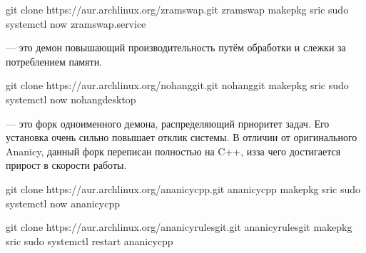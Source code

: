 \documentclass[letterpaper,10pt,russian,openany]{sphinxmanual}
\begin{document}
\begin{sphinxVerbatim}[commandchars=\\\{\}]
git clone https://aur.archlinux.org/zramswap.git  
 zramswap                                       
makepkg \PYGZhy{}sric                                     
sudo systemctl  \PYGZhy{}\PYGZhy{}now zramswap.service      
\end{sphinxVerbatim}

\sphinxAtStartPar
{}   — это демон повышающий производительность путём обработки и слежки за потреблением памяти.

\begin{sphinxVerbatim}[commandchars=\\\{\}]
git clone https://aur.archlinux.org/nohang\PYGZhy{}git.git 
 nohang\PYGZhy{}git                                      
makepkg \PYGZhy{}sric                                      
sudo systemctl  \PYGZhy{}\PYGZhy{}now nohang\PYGZhy{}desktop         
\end{sphinxVerbatim}

\sphinxAtStartPar
{}  — это форк одноименного демона, распределяющий приоритет задач. Его установка очень сильно повышает отклик системы. В отличии от оригинального Ananicy, данный форк переписан полностью на C++, из\sphinxhyphen{}за чего достигается прирост в скорости работы.

\begin{sphinxVerbatim}[commandchars=\\\{\}]
git clone https://aur.archlinux.org/ananicy\PYGZhy{}cpp.git 
 ananicy\PYGZhy{}cpp                                      
makepkg \PYGZhy{}sric                                       
sudo systemctl  \PYGZhy{}\PYGZhy{}now ananicy\PYGZhy{}cpp             

git clone https://aur.archlinux.org/ananicy\PYGZhy{}rules\PYGZhy{}git.git 
 ananicy\PYGZhy{}rules\PYGZhy{}git                                      
makepkg \PYGZhy{}sric                                             
sudo systemctl restart ananicy\PYGZhy{}cpp                        
\end{sphinxVerbatim}
\end{document}
